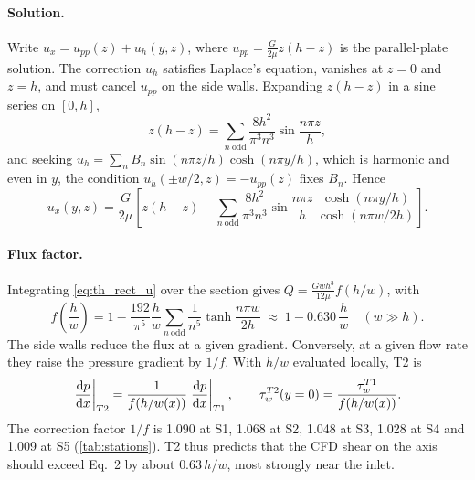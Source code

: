 \paragraph{Solution.} Write $u_x=u_{pp}(z)+u_h(y,z)$, where $u_{pp}=\frac{G}{2\mu}z(h-z)$ is the parallel-plate solution. The correction $u_h$ satisfies Laplace's equation, vanishes at $z=0$ and $z=h$, and must cancel $u_{pp}$ on the side walls. Expanding $z(h-z)$ in a sine series on $[0,h]$,
\begin{equation}
z(h-z)=\sum_{n\ \mathrm{odd}}\frac{8h^2}{\pi^3n^3}\sin\frac{n\pi z}{h},
\end{equation}
and seeking $u_h=\sum_nB_n\sin(n\pi z/h)\cosh(n\pi y/h)$, which is harmonic and even in $y$, the condition $u_h(\pm w/2,z)=-u_{pp}(z)$ fixes $B_n$. Hence
\begin{equation}
u_x(y,z)=\frac{G}{2\mu}\left[z(h-z)-\sum_{n\ \mathrm{odd}}\frac{8h^2}{\pi^3n^3}\sin\frac{n\pi z}{h}\,\frac{\cosh(n\pi y/h)}{\cosh(n\pi w/2h)}\right].
\label{eq:th_rect_u}
\end{equation}
\paragraph{Flux factor.} Integrating \cref{eq:th_rect_u} over the section gives $Q=\frac{Gwh^3}{12\mu}f(h/w)$, with
\begin{equation}
f\!\left(\frac hw\right)=1-\frac{192}{\pi^5}\frac{h}{w}\sum_{n\ \mathrm{odd}}\frac{1}{n^5}\tanh\frac{n\pi w}{2h}\;\approx\;1-0.630\,\frac hw\quad(w\gg h).
\label{eq:th_flux_factor}
\end{equation}
The side walls reduce the flux at a given gradient. Conversely, at a given flow rate they raise the pressure gradient by $1/f$. With $h/w$ evaluated locally, T2 is
\begin{equation}
\left.\frac{\mathrm{d} p}{\mathrm{d} x}\right|_{T2}=\frac{1}{f(h/w(x))}\left.\frac{\mathrm{d} p}{\mathrm{d} x}\right|_{T1},
\qquad
\tau_{w}^{T2}(y=0)=\frac{\tau_{w}^{T1}}{f(h/w(x))}.
\label{eq:th_T2}
\end{equation}
The correction factor $1/f$ is 1.090 at S1, 1.068 at S2, 1.048 at S3, 1.028 at S4 and 1.009 at S5 (\cref{tab:stations}). T2 thus predicts that the CFD shear on the axis should exceed Eq.~2 by about $0.63\,h/w$, most strongly near the inlet.

